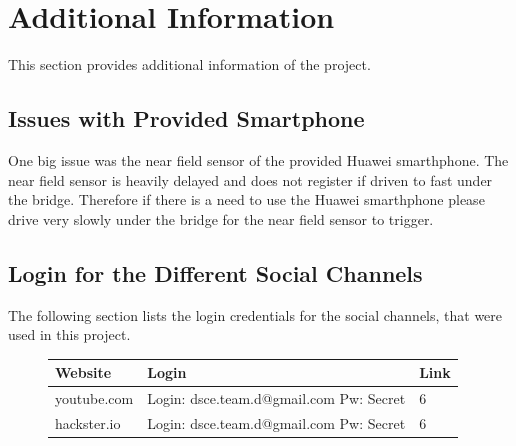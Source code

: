 \section{Additional Information}
This section provides additional information of the project. 

\subsection{Issues with Provided Smartphone}
One big issue was the near field sensor of the provided Huawei smarthphone. The near field sensor is heavily delayed and does not register if driven to fast under the bridge. Therefore if there is a need to use the Huawei smarthphone please drive very slowly under the bridge for the near field sensor to trigger. 

\subsection{Login for the Different Social Channels}
The following section lists the login credentials for the social channels, that were used in this project.
\begin{figure}[H]
	\centering
	\begin{tabular}{ l | p{5.6cm} | l }
		Website & Login & Link \\ \hline
		youtube.com & Login: dsce.team.d@gmail.com Pw: Secret & 6 \\
		hackster.io & Login: dsce.team.d@gmail.com Pw: Secret & 6 \\
	\end{tabular}
\end{figure}

